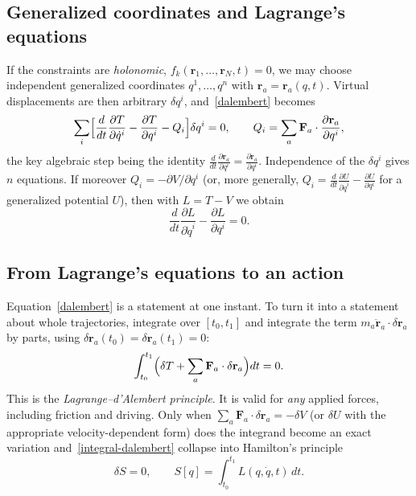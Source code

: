 \subsection{Generalized coordinates and Lagrange's equations}

If the constraints are \emph{holonomic}, $f_k(\mathbf r_1,\dots,\mathbf r_N,t)=0$,
we may choose independent generalized coordinates $q^1,\dots,q^n$ with
$\mathbf r_a=\mathbf r_a(q,t)$. Virtual displacements are then arbitrary
$\delta q^i$, and~\eqref{dalembert} becomes
\begin{equation}
  \sum_i\Bigl[\frac{d}{dt}\frac{\partial T}{\partial\dot q^i}
  -\frac{\partial T}{\partial q^i}-Q_i\Bigr]\delta q^i=0,
  \qquad Q_i=\sum_a\mathbf F_a\cdot\frac{\partial\mathbf r_a}{\partial q^i},
  \label{lagrange-T}
\end{equation}
the key algebraic step being the identity
$\frac{d}{dt}\frac{\partial\mathbf r_a}{\partial q^i}
=\frac{\partial\dot{\mathbf r}_a}{\partial q^i}$. Independence of the
$\delta q^i$ gives $n$ equations. If moreover $Q_i=-\partial V/\partial q^i$
(or, more generally, $Q_i=\frac{d}{dt}\frac{\partial U}{\partial\dot q^i}
-\frac{\partial U}{\partial q^i}$ for a generalized potential $U$), then with
$L=T-V$ we obtain
\begin{equation}
  \frac{d}{dt}\frac{\partial L}{\partial\dot q^i}-\frac{\partial L}{\partial q^i}=0 .
  \label{EL}
\end{equation}

\subsection{From Lagrange's equations to an action}

Equation~\eqref{dalembert} is a statement at one instant. To turn it into
a statement about whole trajectories, integrate over $[t_0,t_1]$ and integrate
the term $m_a\ddot{\mathbf r}_a\cdot\delta\mathbf r_a$ by parts, using
$\delta\mathbf r_a(t_0)=\delta\mathbf r_a(t_1)=0$:
\begin{equation}
  \int_{t_0}^{t_1}\Bigl(\delta T+\sum_a\mathbf F_a\cdot\delta\mathbf r_a\Bigr)dt=0 .
  \label{integral-dalembert}
\end{equation}
This is the \emph{Lagrange--d'Alembert principle}. It is valid for \emph{any}
applied forces, including friction and driving. Only when
$\sum_a\mathbf F_a\cdot\delta\mathbf r_a=-\delta V$ (or $\delta U$ with the
appropriate velocity-dependent form) does the integrand become an exact
variation and~\eqref{integral-dalembert} collapse into Hamilton's principle
\begin{equation}
  \delta S=0,\qquad S[q]=\int_{t_0}^{t_1}L(q,\dot q,t)\,dt .
  \label{hamilton}
\end{equation}

